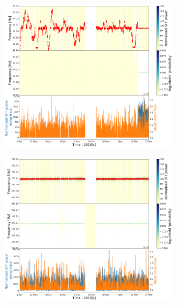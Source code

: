 %
\begin{figure}[ht]
	\centering
	\begin{subfigure}[h]{0.49\textwidth}
		\includegraphics[width=\textwidth]{C6_detchar/track_F63_95_64_05.png}
		\caption{\label{detchar:soap:newlines:1}}
	\end{subfigure}
	\begin{subfigure}[h]{0.49\textwidth}
		\includegraphics[width=\textwidth]{C6_detchar/track_F299_65_299_75.png}
		\caption{\label{detchar:soap:newlines:2}}
	\end{subfigure}
	

\end{figure}
